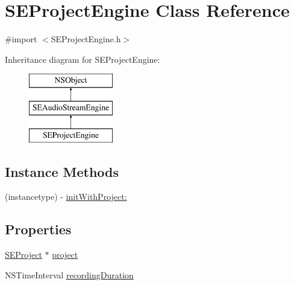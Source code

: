 \hypertarget{interface_s_e_project_engine}{\section{S\-E\-Project\-Engine Class Reference}
\label{interface_s_e_project_engine}
}


{\ttfamily \#import $<$S\-E\-Project\-Engine.\-h$>$}

Inheritance diagram for S\-E\-Project\-Engine\-:\begin{figure}[H]
\begin{center}
\leavevmode
\includegraphics[height=3.000000cm]{interface_s_e_project_engine}
\end{center}
\end{figure}
\subsection*{Instance Methods}
\begin{DoxyCompactItemize}
\item 
(instancetype) -\/ \hyperlink{interface_s_e_project_engine_a7efbca25d6d786ef7d7ef089001d1c07}{init\-With\-Project\-:}
\end{DoxyCompactItemize}
\subsection*{Properties}
\begin{DoxyCompactItemize}
\item 
\hyperlink{interface_s_e_project}{S\-E\-Project} $\ast$ \hyperlink{interface_s_e_project_engine_abd99ade297e556e2e2835721016e3980}{project}
\item 
N\-S\-Time\-Interval \hyperlink{interface_s_e_project_engine_ae554c2354d873ce6d7194a8278e0acbc}{recording\-Duration}
\end{DoxyCompactItemize}


